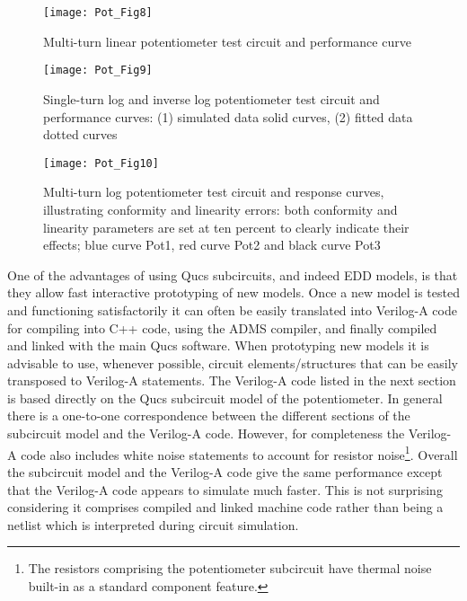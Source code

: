 \begin{figure} [h] 
  \centering
  \texttt{[image: Pot\_Fig8]}
  \caption{Multi-turn linear potentiometer test circuit and performance curve}
  \label{fig:Pot8}
\end{figure} 


\begin{figure} [h]  
  \centering
  \texttt{[image: Pot\_Fig9]}
  \caption{Single-turn log and inverse log potentiometer test circuit and performance curves: (1) simulated data  solid curves, (2) fitted data dotted curves}
  \label{fig:Pot9}
\end{figure} 


\begin{figure} [h] 
  \centering
  \texttt{[image: Pot\_Fig10]}
  \caption{Multi-turn log potentiometer test circuit and response curves, illustrating conformity and linearity errors: both conformity and linearity parameters are set at ten percent to clearly indicate their effects; blue curve Pot1, red curve Pot2 and black curve Pot3}
  \label{fig:Pot10}
\end{figure} 



One of the advantages of using Qucs subcircuits, and indeed EDD
models, is that they allow fast interactive prototyping of new models.
Once a new model is tested and functioning satisfactorily it can often
be easily translated into Verilog-A code for compiling into C++ code,
using the ADMS compiler, and finally compiled and linked with the main
Qucs software. When prototyping new models it is advisable to use,
whenever possible, circuit elements/structures that can be easily
transposed to Verilog-A statements.  The Verilog-A code listed in the
next section is based directly on the Qucs subcircuit model of the
potentiometer. In general there is a one-to-one correspondence between
the different sections of the subcircuit model and the Verilog-A code.
However, for completeness the Verilog-A code also includes white noise
statements to account for resistor noise\footnote{The resistors
comprising the potentiometer subcircuit have thermal noise built-in as
a standard component feature.}.  Overall the subcircuit model and the
Verilog-A code give the same performance except that the Verilog-A
code appears to simulate much faster. This is not surprising
considering it comprises compiled and linked machine code rather than
being a netlist which is interpreted during circuit simulation.

